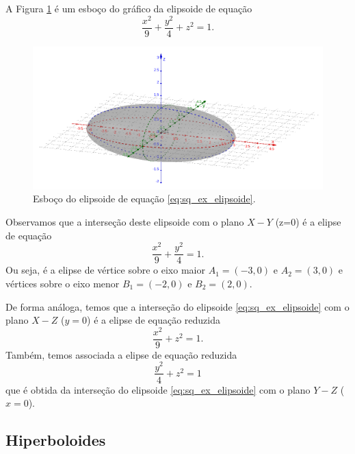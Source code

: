 \begin{ex}
  A Figura \ref{fig:sq_ex_elipsoide} é um esboço do gráfico da elipsoide de equação
  \begin{equation}\label{eq:sq_ex_elipsoide}
    \frac{x^2}{9} + \frac{y^2}{4} + z^2=1.
  \end{equation}
  
  \begin{figure}[H]
    \centering
    \includegraphics[width=\textwidth]{./cap_superquad/dados/fig_sq_ex_elipsoide/fig}
    \caption{Esboço do elipsoide de equação \eqref{eq:sq_ex_elipsoide}.}
    \label{fig:sq_ex_elipsoide}
  \end{figure}

  Observamos que a interseção deste elipsoide com o plano $X-Y$ (z=0) é a elipse de equação
  \begin{equation}
    \frac{x^2}{9}+\frac{y^2}{4}=1.
  \end{equation}
  Ou seja, é a elipse de vértice sobre o eixo maior $A_1=(-3,0)$ e $A_2=(3,0)$ e vértices sobre o eixo menor $B_1=(-2,0)$ e $B_2=(2,0)$.

  De forma análoga, temos que a interseção do elipsoide \eqref{eq:sq_ex_elipsoide} com o plano $X-Z$ ($y=0$) é a elipse de equação reduzida
  \begin{equation}
    \frac{x^2}{9} + z^2 = 1.
  \end{equation}
  Também, temos associada a elipse de equação reduzida
  \begin{equation}
    \frac{y^2}{4}+z^2=1
  \end{equation}
  que é obtida da interseção do elipsoide \eqref{eq:sq_ex_elipsoide} com o plano $Y-Z$ ($x=0$).  
\end{ex}

\subsection{Hiperboloides}

